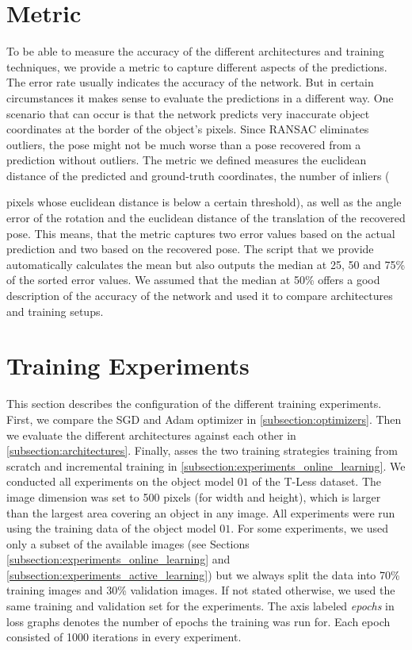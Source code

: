 \section{Metric}

To be able to measure the accuracy of the different architectures and training techniques, we provide a metric to capture different aspects of the predictions. The error rate usually indicates the accuracy of the network. But in certain circumstances it makes sense to evaluate the predictions in a different way. One scenario that can occur is that the network predicts very inaccurate object coordinates at the border of the object's pixels. Since RANSAC eliminates outliers, the pose might not be much worse than a pose recovered from a prediction without outliers. The metric we defined measures the euclidean distance of the predicted and ground-truth coordinates, the number of inliers (

pixels whose euclidean distance is below a certain threshold), as well as the angle error of the rotation and the euclidean distance of the translation of the recovered pose. This means, that the metric captures two error values based on the actual prediction and two based on the recovered pose. The script that we provide automatically calculates the mean but also outputs the median at 25, 50 and 75\% of the sorted error values. We assumed that the median at 50\% offers a good description of the accuracy of the network and used it to compare architectures and training setups.

\section{Training Experiments}

This section describes the configuration of the different training experiments. First, we compare the SGD and Adam optimizer in \ref{subsection:optimizers}. Then we evaluate the different architectures against each other in \ref{subsection:architectures}. Finally, asses the two training strategies training from scratch and incremental training in \ref{subsection:experiments_online_learning}. We conducted all experiments on the object model $01$ of the T-Less dataset. The image dimension was set to 500 pixels (for width and height), which is larger than the largest area covering an object in any image. All experiments were run using the training data of the object model $01$. For some experiments, we used only a subset of the available images (see Sections \ref{subsection:experiments_online_learning} and \ref{subsection:experiments_active_learning}) but we always split the data into 70\% training images and 30\% validation images. If not stated otherwise, we used the same training and validation set for the experiments. The axis labeled \textit{epochs} in loss graphs denotes the number of epochs the training was run for. Each epoch consisted of 1000 iterations in every experiment.

